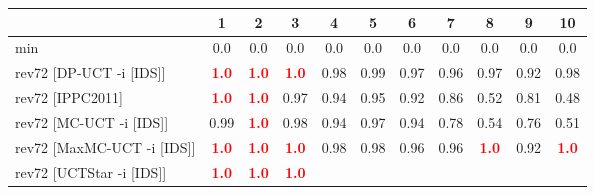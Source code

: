 \documentclass{article}
\begin{document}
\begin{tabular}{|l|r@{$\pm$}rr@{$\pm$}rr@{$\pm$}rr@{$\pm$}rr@{$\pm$}rr@{$\pm$}rr@{$\pm$}rr@{$\pm$}rr@{$\pm$}rr@{$\pm$}r|}
\hline

& \multicolumn{2}{c}{1}
& \multicolumn{2}{c}{2}
& \multicolumn{2}{c}{3}
& \multicolumn{2}{c}{4}
& \multicolumn{2}{c}{5}
& \multicolumn{2}{c}{6}
& \multicolumn{2}{c}{7}
& \multicolumn{2}{c}{8}
& \multicolumn{2}{c}{9}
& \multicolumn{2}{c|}{10}
\\
\hline
\hline
min
& \multicolumn{2}{c}{0.0}
& \multicolumn{2}{c}{0.0}
& \multicolumn{2}{c}{0.0}
& \multicolumn{2}{c}{0.0}
& \multicolumn{2}{c}{0.0}
& \multicolumn{2}{c}{0.0}
& \multicolumn{2}{c}{0.0}
& \multicolumn{2}{c}{0.0}
& \multicolumn{2}{c}{0.0}
& \multicolumn{2}{c|}{0.0}
\\
rev72 [DP-UCT -i [IDS]]
& \multicolumn{2}{c}{\textbf{\textcolor{red}{1.0}}}
& \multicolumn{2}{c}{\textbf{\textcolor{red}{1.0}}}
& \multicolumn{2}{c}{\textbf{\textcolor{red}{1.0}}}
& \multicolumn{2}{c}{0.98}
& \multicolumn{2}{c}{0.99}
& \multicolumn{2}{c}{0.97}
& \multicolumn{2}{c}{0.96}
& \multicolumn{2}{c}{0.97}
& \multicolumn{2}{c}{0.92}
& \multicolumn{2}{c|}{0.98}
\\
rev72 [IPPC2011]
& \multicolumn{2}{c}{\textbf{\textcolor{red}{1.0}}}
& \multicolumn{2}{c}{\textbf{\textcolor{red}{1.0}}}
& \multicolumn{2}{c}{0.97}
& \multicolumn{2}{c}{0.94}
& \multicolumn{2}{c}{0.95}
& \multicolumn{2}{c}{0.92}
& \multicolumn{2}{c}{0.86}
& \multicolumn{2}{c}{0.52}
& \multicolumn{2}{c}{0.81}
& \multicolumn{2}{c|}{0.48}
\\
rev72 [MC-UCT -i [IDS]]
& \multicolumn{2}{c}{0.99}
& \multicolumn{2}{c}{\textbf{\textcolor{red}{1.0}}}
& \multicolumn{2}{c}{0.98}
& \multicolumn{2}{c}{0.94}
& \multicolumn{2}{c}{0.97}
& \multicolumn{2}{c}{0.94}
& \multicolumn{2}{c}{0.78}
& \multicolumn{2}{c}{0.54}
& \multicolumn{2}{c}{0.76}
& \multicolumn{2}{c|}{0.51}
\\
rev72 [MaxMC-UCT -i [IDS]]
& \multicolumn{2}{c}{\textbf{\textcolor{red}{1.0}}}
& \multicolumn{2}{c}{\textbf{\textcolor{red}{1.0}}}
& \multicolumn{2}{c}{\textbf{\textcolor{red}{1.0}}}
& \multicolumn{2}{c}{0.98}
& \multicolumn{2}{c}{0.98}
& \multicolumn{2}{c}{0.96}
& \multicolumn{2}{c}{0.96}
& \multicolumn{2}{c}{\textbf{\textcolor{red}{1.0}}}
& \multicolumn{2}{c}{0.92}
& \multicolumn{2}{c|}{\textbf{\textcolor{red}{1.0}}}
\\
rev72 [UCTStar -i [IDS]]
& \multicolumn{2}{c}{\textbf{\textcolor{red}{1.0}}}
& \multicolumn{2}{c}{\textbf{\textcolor{red}{1.0}}}
& \multicolumn{2}{c}{\textbf{\textcolor{red}{1.0}}}

\end{tabular}
\end{document}
